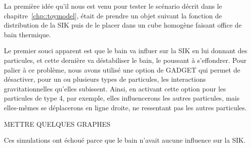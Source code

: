 La première idée qu'il nous est venu pour tester le scénario décrit dans le
chapitre~\ref{chp::toymodel}, était de prendre un objet suivant la fonction de
distribution de la SIK puis de le placer dans un cube homogène faisant office de
bain thermique.

Le premier souci apparent est que le bain va influer sur la SIK en lui donnant
des particules, et cette dernière va déstabiliser le bain, le poussant à
s'effondrer. Pour palier à ce problème, nous avons utilisé une option de
\textsc{GADGET} qui permet de désactiver, pour un ou plusieurs types de
particules, les interactions gravitationnelles qu'elles subissent.
Ainsi, en activant cette option pour les particules de type 4, par exemple,
elles influencerons les autres particules, mais elles-mêmes se déplacerons en
ligne droite, ne ressentant pas les autres particules.

METTRE QUELQUES GRAPHES

Ces simulations ont échoué parce que le bain n'avait aucune influence sur la
SIK.
